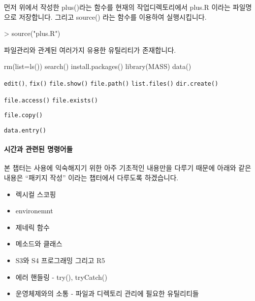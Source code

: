 먼저 위에서 작성한 plus()라는 함수를 현재의 작업디렉토리에서 plus.R 이라는 파일명으로 저장합니다. 
그리고 source() 라는 함수를 이용하여 실행시킵니다. 
\begin{Schunk}
\begin{Soutput}
> source("plus.R")
\end{Soutput}
\end{Schunk}

파일관리와 관계된 여러가지 유용한 유틸리티가 존재합니다. 
\begin{Schunk}
\begin{Soutput}
rm(list=ls())
search()
install.packages()
library(MASS)
data()
\end{Soutput}
\end{Schunk}

\texttt{edit()},
\texttt{fix()}
\texttt{file.show()}
\texttt{file.path()}
\texttt{list.files()}
\texttt{dir.create()}

\texttt{file.access()}
\texttt{file.exists()}

\texttt{file.copy()}

\texttt{data.entry()}

\paragraph{시간과 관련된 명령어들}



본 챕터는 사용에 익숙해지기 위한 아주 기초적인 내용만을 다루기 때문에 아래와 같은 내용은 ``패키지 작성'' 이라는 챕터에서 다루도록 하겠습니다. 

\begin{itemize}
	\item 렉시컬 스코핑 
	\item environemnt
	\item 제네릭 함수 
	\item 메소드와 클래스 
	\item S3와 S4 프로그래밍 그리고 R5
	\item 에러 핸들링 - try(), tryCatch()
	\item 운영체제와의 소통 - 파일과 디렉토리 관리에 필요한 유틸리티들 
\end{itemize}
	

